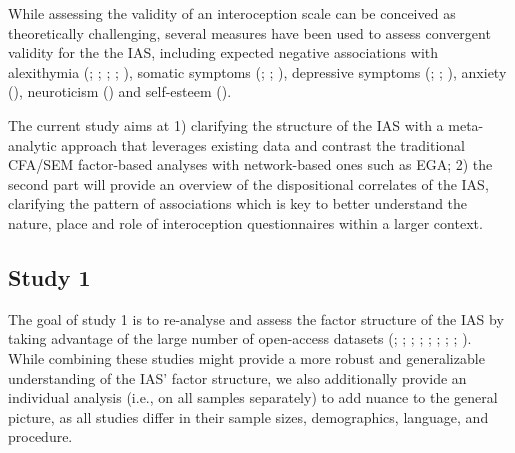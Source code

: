 \documentclass[
  man,
  floatsintext,
  longtable,
  nolmodern,
  notxfonts,
  notimes,
  colorlinks=true,linkcolor=blue,citecolor=blue,urlcolor=blue]{apa7}
\begin{document}
While assessing the validity of an interoception scale can be conceived
as theoretically challenging, several measures have been used to assess
convergent validity for the the IAS, including expected negative
associations with alexithymia (; ;
;
;
), somatic symptoms
(;
;
), depressive symptoms
(;
;
), anxiety
(), neuroticism
() and self-esteem
().

The current study aims at 1) clarifying the structure of the IAS with a
meta-analytic approach that leverages existing data and contrast the
traditional CFA/SEM factor-based analyses with network-based ones such
as EGA; 2) the second part will provide an overview of the dispositional
correlates of the IAS, clarifying the pattern of associations which is
key to better understand the nature, place and role of interoception
questionnaires within a larger context.

\subsection{Study 1}\label{study-1}

The goal of study 1 is to re-analyse and assess the factor structure of
the IAS by taking advantage of the large number of open-access datasets
(;
;
;
;
;
;
;
; ). While combining these studies might provide a more
robust and generalizable understanding of the IAS' factor structure, we
also additionally provide an individual analysis (i.e., on all samples
separately) to add nuance to the general picture, as all studies differ
in their sample sizes, demographics, language, and procedure.
\end{document}
